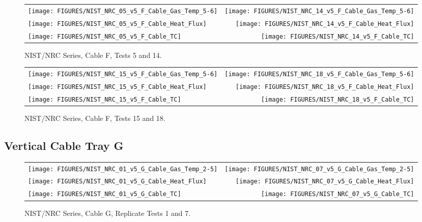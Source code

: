 \begin{figure}[h]
\begin{tabular*}{\textwidth}{l@{\extracolsep{\fill}}r}
\texttt{[image: FIGURES/NIST\_NRC\_05\_v5\_F\_Cable\_Gas\_Temp\_5-6]} &
\texttt{[image: FIGURES/NIST\_NRC\_14\_v5\_F\_Cable\_Gas\_Temp\_5-6]} \\
\texttt{[image: FIGURES/NIST\_NRC\_05\_v5\_F\_Cable\_Heat\_Flux]} &
\texttt{[image: FIGURES/NIST\_NRC\_14\_v5\_F\_Cable\_Heat\_Flux]} \\
\texttt{[image: FIGURES/NIST\_NRC\_05\_v5\_F\_Cable\_TC]} &
\texttt{[image: FIGURES/NIST\_NRC\_14\_v5\_F\_Cable\_TC]}
\end{tabular*}
\caption{NIST/NRC Series, Cable F, Tests 5 and 14.}
\label{NIST_NRC_F_5_and_14}
\end{figure}

\begin{figure}[h]
\begin{tabular*}{\textwidth}{l@{\extracolsep{\fill}}r}
\texttt{[image: FIGURES/NIST\_NRC\_15\_v5\_F\_Cable\_Gas\_Temp\_5-6]} &
\texttt{[image: FIGURES/NIST\_NRC\_18\_v5\_F\_Cable\_Gas\_Temp\_5-6]} \\
\texttt{[image: FIGURES/NIST\_NRC\_15\_v5\_F\_Cable\_Heat\_Flux]} &
\texttt{[image: FIGURES/NIST\_NRC\_18\_v5\_F\_Cable\_Heat\_Flux]} \\
\texttt{[image: FIGURES/NIST\_NRC\_15\_v5\_F\_Cable\_TC]} &
\texttt{[image: FIGURES/NIST\_NRC\_18\_v5\_F\_Cable\_TC]}
\end{tabular*}
\caption{NIST/NRC Series, Cable F, Tests 15 and 18.}
\label{NIST_NRC_F_15_and_18}
\end{figure}


\clearpage




\subsection{Vertical Cable Tray G}

\vspace{1in}

\begin{figure}[h!]
\begin{tabular*}{\textwidth}{l@{\extracolsep{\fill}}r}
\texttt{[image: FIGURES/NIST\_NRC\_01\_v5\_G\_Cable\_Gas\_Temp\_2-5]} &
\texttt{[image: FIGURES/NIST\_NRC\_07\_v5\_G\_Cable\_Gas\_Temp\_2-5]} \\
\texttt{[image: FIGURES/NIST\_NRC\_01\_v5\_G\_Cable\_Heat\_Flux]} &
\texttt{[image: FIGURES/NIST\_NRC\_07\_v5\_G\_Cable\_Heat\_Flux]} \\
\texttt{[image: FIGURES/NIST\_NRC\_01\_v5\_G\_Cable\_TC]} &
\texttt{[image: FIGURES/NIST\_NRC\_07\_v5\_G\_Cable\_TC]}
\end{tabular*}
\caption{NIST/NRC Series, Cable G, Replicate Tests 1 and 7.}
\label{NIST_NRC_G_1_and_7}
\end{figure}

